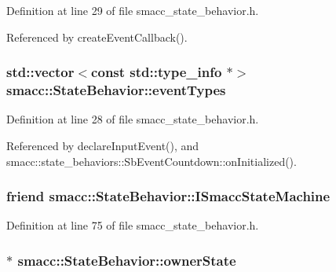 Definition at line 29 of file smacc\+\_\+state\+\_\+behavior.\+h.



Referenced by create\+Event\+Callback().

\subsubsection[{\texorpdfstring{event\+Types}{eventTypes}}]{\setlength{\rightskip}{0pt plus 5cm}std\+::vector$<$const std\+::type\+\_\+info $\ast$$>$ smacc\+::\+State\+Behavior\+::event\+Types}\hypertarget{classsmacc_1_1StateBehavior_a2df8158ebc3bb0f82c55824f088288bb}{}\label{classsmacc_1_1StateBehavior_a2df8158ebc3bb0f82c55824f088288bb}


Definition at line 28 of file smacc\+\_\+state\+\_\+behavior.\+h.



Referenced by declare\+Input\+Event(), and smacc\+::state\+\_\+behaviors\+::\+Sb\+Event\+Countdown\+::on\+Initialized().

\subsubsection[{\texorpdfstring{I\+Smacc\+State\+Machine}{ISmaccStateMachine}}]{\setlength{\rightskip}{0pt plus 5cm}friend smacc\+::\+State\+Behavior\+::\+I\+Smacc\+State\+Machine\hspace{0.3cm}{\ttfamily [private]}}\hypertarget{classsmacc_1_1StateBehavior_a4bc03d3369b90283c91d7046461a554a}{}\label{classsmacc_1_1StateBehavior_a4bc03d3369b90283c91d7046461a554a}


Definition at line 75 of file smacc\+\_\+state\+\_\+behavior.\+h.

\subsubsection[{\texorpdfstring{owner\+State}{ownerState}}]{$\ast$ smacc\+::\+State\+Behavior\+::owner\+State}\hypertarget{classsmacc_1_1StateBehavior_abdc8c883baf520fd01f98e046d045dca}{}\label{classsmacc_1_1StateBehavior_abdc8c883baf520fd01f98e046d045dca}


